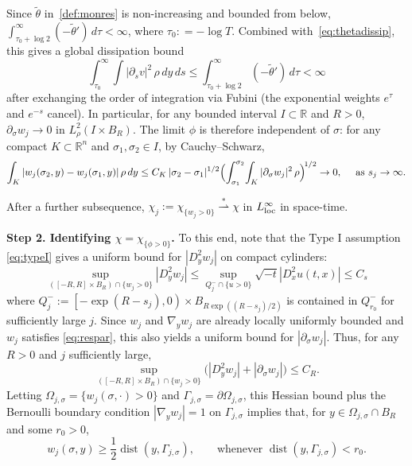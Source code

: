 \documentclass[11pt]{article}
\numberwithin{equation}{section}
\theoremstyle{definition}
\newcommand{\RR}{\mathbb{R}}
\begin{document}
Since $\tilde\theta$ in~\eqref{def:monres} is non-increasing and bounded from below, $\int_{\tau_0+\log 2}^\infty(-\tilde\theta')\,d\tau<\infty$, where $\tau_0: =-\log T$. Combined with~\eqref{eq:thetadissip}, this gives a global dissipation bound
\begin{equation*}
    \int_{\tau_0}^\infty\!\int|\partial_s v|^2\,\rho\,dy\,ds \leq  \int_{\tau_0+\log 2}^\infty(-\tilde\theta')\,d\tau <\infty 
\end{equation*} 
after exchanging the order of integration via Fubini (the exponential weights $e^{\tau}$ and $e^{-s}$ cancel). In particular, for any bounded interval $I\subset\RR$ and $R>0$, $\partial_\sigma w_j\to 0$ in $L^2_\rho(I\times B_R)$. The limit $\phi$ is therefore independent of $\sigma$: for any compact $K\subset\RR^n$ and $\sigma_1,\sigma_2\in I$, by Cauchy--Schwarz,
\[
\int_K|w_j(\sigma_2,y)-w_j(\sigma_1,y)|\,\rho\,dy
\leq C_K\,|\sigma_2-\sigma_1|^{1/2}
\Bigl(\int_{\sigma_1}^{\sigma_2}\!\int_K|\partial_\sigma w_j|^2\,\rho\Bigr)^{\!1/2}\to 0, \quad \text{ as } s_j\to \infty.
\]

After a further subsequence, $\chi_j:=\chi_{\{w_j>0\}}\overset{\ast}{\rightharpoonup} \chi$ in $L^\infty_{\rm loc}$ in space-time. 

{\bf Step 2. Identifying $\chi=\chi_{\{\phi>0\}}$.} To this end, note that the Type I assumption \eqref{eq:typeI} gives a uniform bound for $|D^2_y w_j|$ on compact cylinders:
\begin{equation}\label{eq:HessianUB}
    \sup_{([-R,R]\times B_R)\cap \{w_j>0\}} |D^2_{y} w_j| \leq \sup_{Q_j^- \cap \{u>0\}} \sqrt{-t} |D_x^2 u(t,x)| \leq C_s
\end{equation} 
where $Q_j^-:= \left[-\exp(R-s_j),0 \right) \times B_{R \exp( (R-s_j)/2)}$ is contained in $Q_{r_0}^-$ for sufficiently large $j$.
Since $w_j$ and $\nabla_y w_j$ are already locally uniformly bounded and $w_j$ satisfies \eqref{eq:respar}, this also yields a uniform bound for $|\partial_\sigma w_j|$. Thus, for any
$R>0$ and $j$ sufficiently large,
\begin{equation}\label{eq:rescaledC2}
    \sup_{([-R,R]\times B_R)\cap \{w_j>0\}}\bigl(|D^2_{y} w_j|+|\partial_{\sigma}w_j|\bigr) \leq C_R.
\end{equation}
Letting $\Omega_{j,\sigma}=\{w_j(\sigma,\cdot)>0\}$ and $\Gamma_{j,\sigma}=\partial \Omega_{j,\sigma}$, this Hessian bound plus the Bernoulli boundary condition $|\nabla_{y}w_j|=1$ on $\Gamma_{j,\sigma}$ implies that, for $y\in \Omega_{j,\sigma}\cap B_R$ and some $r_0 >0$,
\begin{equation}\label{eq:nearbd-lower}
w_j(\sigma,y)\geq \frac{1}{2}\operatorname{dist}(y,\Gamma_{j,\sigma}), \qquad \text{whenever } \operatorname{dist}(y,\Gamma_{j,\sigma})<r_0.
\end{equation}
\end{document}
